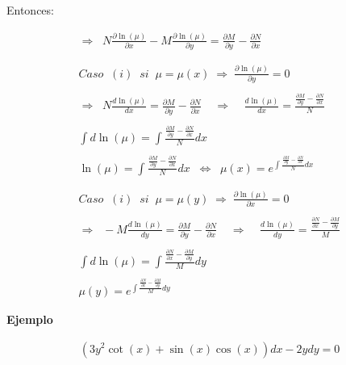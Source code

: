 Entonces:

\begin{equation*}
    \begin{gathered}
        \Rightarrow\;\;N\frac{\partial{\ln(\mu)}}{\partial{x}}-M\frac{\partial{\ln(\mu)}}{\partial{y}}=\frac{\partial{M}}{\partial{y}}-\frac{\partial{N}}{\partial{x}}\\\\\\
        Caso\;\;(i)\;\;si\;\;\mu=\mu(x)\;\Rightarrow\;\frac{\partial{\ln(\mu)}}{\partial{y}}=0\\\\
        \Rightarrow\;\;N\frac{d\ln(\mu)}{dx}=\frac{\partial{M}}{\partial{y}}-\frac{\partial{N}}{\partial{x}}\;\;\;\;\Rightarrow\;\;\;\;\frac{d\ln(\mu)}{dx}=\frac{\frac{\partial{M}}{\partial{y}}-\frac{\partial{N}}{\partial{x}}}{N}\\\\
        \int d\ln(\mu)=\int\frac{\frac{\partial{M}}{\partial{y}}-\frac{\partial{N}}{\partial{x}}}{N}dx\\\\
        \ln(\mu)=\int\frac{\frac{\partial{M}}{\partial{y}}-\frac{\partial{N}}{\partial{x}}}{N}dx\;\;\Leftrightarrow\;\;\mu(x)=e^{\int{\frac{\frac{\partial{M}}{\partial{y}}-\frac{\partial{N}}{\partial{x}}}{N}dx}}\\\\\\
        Caso\;\;(i)\;\;si\;\;\mu=\mu(y)\;\Rightarrow\;\frac{\partial{\ln(\mu)}}{\partial{x}}=0\\\\
        \Rightarrow\;\;-M\frac{d\ln(\mu)}{dy}=\frac{\partial{M}}{\partial{y}}-\frac{\partial{N}}{\partial{x}}\;\;\;\;\Rightarrow\;\;\;\;\frac{d\ln(\mu)}{dy}=\frac{\frac{\partial{N}}{\partial{x}}-\frac{\partial{M}}{\partial{y}}}{M}\\\\
        \int d\ln(\mu)=\int\frac{\frac{\partial{N}}{\partial{x}}-\frac{\partial{M}}{\partial{y}}}{M}dy\\\\
        \mu(y)=e^{\int\frac{\frac{\partial{N}}{\partial{x}}-\frac{\partial{M}}{\partial{y}}}{M}dy}
    \end{gathered}
\end{equation*}

\clearpage

\textbf{Ejemplo}

\begin{equation}
    \begin{gathered}
        \left(3y^{2}\cot(x)+\sin(x)\cos(x)\right)dx-2ydy=0
    \end{gathered}
\end{equation}

